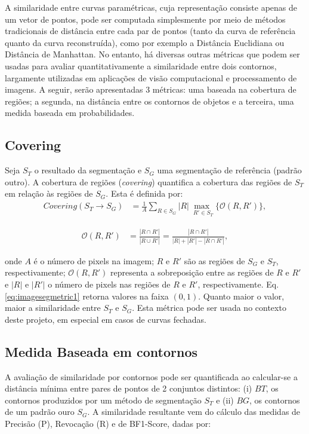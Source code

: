 \documentclass[
	12pt,				%
	oneside,			%
	a4paper,			%
	sumario=tradicional,
	english,			%
	french,				%
	spanish,			%
	brazil,				%
]{abntex2}
\begin{document}
A similaridade entre curvas paramétricas, cuja representação consiste apenas de um vetor de pontos, pode ser computada simplesmente por meio de métodos tradicionais de distância entre cada par de pontos (tanto da curva de referência quanto da curva reconstruída), como por exemplo a Distância Euclidiana ou Distância de Manhattan. No entanto, há diversas outras métricas que podem ser usadas para avaliar quantitativamente a similaridade entre dois contornos, largamente utilizadas em aplicações de visão computacional e processamento de imagens. A seguir, serão apresentadas 3 métricas: uma baseada na cobertura de regiões; a segunda, na distância entre os contornos de objetos e a terceira, uma medida baseada em probabilidades.  

\subsection{Covering} Seja  $S_T$ o resultado da segmentação e $S_G$ uma segmentação de referência (padrão outro). A cobertura de regiões (\textit{covering}) \cite{Crevier} quantifica a cobertura das regiões de $S_T$ em relação às regiões de $S_G$. Esta é definida por: 
\begin{equation}
  \label{eq:imagesegmetric1}
    \begin{split}
    {Covering(S_T\to S_G)} &= {\frac{1}{A}\sum_{R \in S_G}{|R|\ \underset{R' \in S_T}{\operatorname{max\ }} {\{ \mathcal{O}(R,R')} \}} },
    \end{split}
  \end{equation}

  \begin{equation}
  \label{eq:towregions}
    \begin{split}
    {\mathcal{O}(R,R')} &= {\frac{|R \cap R'|}{|R \cup R'|}} = {\frac{|R \cap R'|}{|R|+|R'| - |R \cap R'|}},
    \end{split}
  \end{equation}
  
\noindent onde  $A$ é o número de pixels na imagem;  $R$ e $R'$ são as regiões de $S_G$ e $S_T$, respectivamente;
$\mathcal{O}(R,R')$ representa a sobreposição entre as regiões de  $R$ e $R'$ e $|R|$ e $|R'|$ o número de pixels nas regiões de $R$ e $R'$, respectivamente. Eq. \ref{eq:imagesegmetric1} retorna valores na faixa $(0,1)$. Quanto maior o valor, maior a similaridade entre $S_T$ e $S_G$. Esta métrica pode ser usada no contexto deste projeto, em especial em casos de curvas fechadas.

\subsection{Medida Baseada em contornos} 
\label{sc:boundarybm}
A avaliação de similaridade por contornos \cite{HuangDom} pode ser quantificada ao calcular-se a distância mínima entre pares de pontos de 2 conjuntos distintos: (i) $BT$, os contornos produzidos por um método de segmentação $S_T$ e (ii) $BG$, os contornos de um padrão ouro $S_G$. A similaridade resultante vem do cálculo das medidas de Precisão (P), Revocação (R) e de BF1-Score, dadas por:
\end{document}
